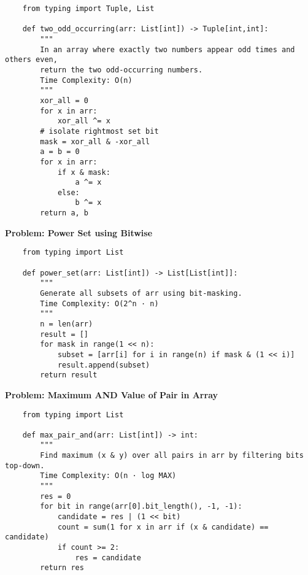     \begin{verbatim}
    from typing import Tuple, List

    def two_odd_occurring(arr: List[int]) -> Tuple[int,int]:
        """
        In an array where exactly two numbers appear odd times and others even,
        return the two odd-occurring numbers.
        Time Complexity: O(n)
        """
        xor_all = 0
        for x in arr:
            xor_all ^= x
        # isolate rightmost set bit
        mask = xor_all & -xor_all
        a = b = 0
        for x in arr:
            if x & mask:
                a ^= x
            else:
                b ^= x
        return a, b
    \end{verbatim}

    \noindent\textbf{Problem: Power Set using Bitwise}
    \begin{verbatim}
    from typing import List

    def power_set(arr: List[int]) -> List[List[int]]:
        """
        Generate all subsets of arr using bit-masking.
        Time Complexity: O(2^n · n)
        """
        n = len(arr)
        result = []
        for mask in range(1 << n):
            subset = [arr[i] for i in range(n) if mask & (1 << i)]
            result.append(subset)
        return result
    \end{verbatim}

    \noindent\textbf{Problem: Maximum AND Value of Pair in Array}
    \begin{verbatim}
    from typing import List

    def max_pair_and(arr: List[int]) -> int:
        """
        Find maximum (x & y) over all pairs in arr by filtering bits top-down.
        Time Complexity: O(n · log MAX)
        """
        res = 0
        for bit in range(arr[0].bit_length(), -1, -1):
            candidate = res | (1 << bit)
            count = sum(1 for x in arr if (x & candidate) == candidate)
            if count >= 2:
                res = candidate
        return res
    \end{verbatim}

